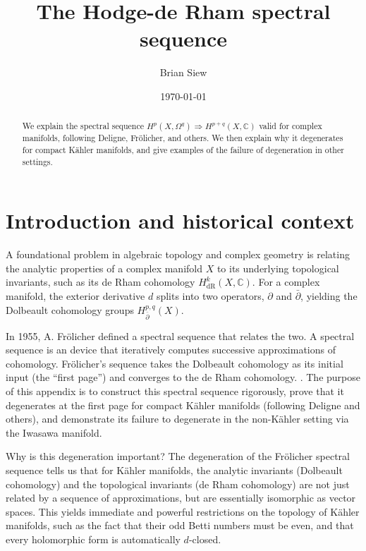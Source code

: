 \documentclass[11pt]{article}
\title{The Hodge-de Rham spectral sequence}
\author{Brian Siew}
\date{\today}
\newcommand{\C}{\mathbb{C}}
\theoremstyle{definition}
\numberwithin{theorem}{section} %
\numberwithin{equation}{section} %
\begin{document}
\maketitle

\begin{abstract}
We explain the spectral sequence $H^p\left(X,\Omega^q\right)\Rightarrow H^{p+q}(X,\C)$ valid for complex manifolds, following Deligne, Fr\"olicher, and others. We then explain why it degenerates for compact K\"ahler manifolds, and give examples of the failure of degeneration in other settings.
\end{abstract}

\tableofcontents
\newpage

\section{Introduction and historical context}

A foundational problem in algebraic topology and complex geometry is relating the analytic properties of a complex manifold $X$ to its underlying topological invariants, such as its de Rham cohomology $H^k_\mathrm{dR}(X, \C)$. For a complex manifold, the exterior derivative $d$ splits into two operators, $\partial$ and $\bar\partial$, yielding the Dolbeault cohomology groups $H^{p,q}_{\bar{\partial}}(X)$.

\medskip

\noindent In 1955, A. Fr\"olicher defined a spectral sequence that relates the two. A spectral sequence is an device that iteratively computes successive approximations of cohomology. Fr\"olicher's sequence takes the Dolbeault cohomology as its initial input (the ``first page'') and converges to the de Rham cohomology. \cite{Frolicher1955}. The purpose of this appendix is to construct this spectral sequence rigorously, prove that it degenerates at the first page for compact K\"ahler manifolds (following Deligne and others), and demonstrate its failure to degenerate in the non-K\"ahler setting via the Iwasawa manifold.

\medskip

\noindent Why is this degeneration important? The degeneration of the Fr\"olicher spectral sequence tells us that for K\"ahler manifolds, the analytic invariants (Dolbeault cohomology) and the topological invariants (de Rham cohomology) are not just related by a sequence of approximations, but are essentially isomorphic as vector spaces. This yields immediate and powerful restrictions on the topology of K\"ahler manifolds, such as the fact that their odd Betti numbers must be even, and that every holomorphic form is automatically $d$-closed.
\end{document}
